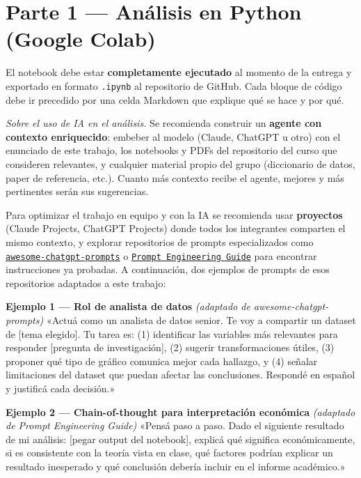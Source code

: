\documentclass[11pt,a4paper]{article}
\begin{document}
\section{Parte 1 --- Análisis en Python (Google Colab)}
El notebook debe estar \textbf{completamente ejecutado} al momento de la entrega y exportado en
formato \texttt{.ipynb} al repositorio de GitHub. Cada bloque de código debe ir precedido por una celda
Markdown que explique qué se hace y por qué.

\emph{Sobre el uso de IA en el análisis.} Se recomienda construir un \textbf{agente con contexto enriquecido}:
embeber al modelo (Claude, ChatGPT u otro) con el enunciado de este trabajo, los notebooks y
PDFs del repositorio del curso que consideren relevantes, y cualquier material propio del grupo
(diccionario de datos, paper de referencia, etc.). Cuanto más contexto recibe el agente, mejores y
más pertinentes serán sus sugerencias.

Para optimizar el trabajo en equipo y con la IA se recomienda usar \textbf{proyectos} (Claude Projects,
ChatGPT Projects) donde todos los integrantes comparten el mismo contexto, y explorar
repositorios de prompts especializados como
\href{https://github.com/f/awesome-chatgpt-prompts}{\texttt{awesome-chatgpt-prompts}} o
\href{https://github.com/dair-ai/Prompt-Engineering-Guide}{\texttt{Prompt Engineering Guide}}
para encontrar instrucciones ya probadas. A continuación, dos ejemplos de prompts de esos
repositorios adaptados a este trabajo:

\begin{prompt}{\textbf{Ejemplo 1 --- Rol de analista de datos} \emph{(adaptado de awesome-chatgpt-prompts)}}
\ttfamily «Actuá como un analista de datos senior. Te voy a compartir un dataset de [tema
elegido]. Tu tarea es: (1) identificar las variables más relevantes para responder
[pregunta de investigación], (2) sugerir transformaciones útiles, (3) proponer
qué tipo de gráfico comunica mejor cada hallazgo, y (4) señalar limitaciones del
dataset que puedan afectar las conclusiones. Respondé en español y justificá cada
decisión.»
\end{prompt}

\begin{prompt}{\textbf{Ejemplo 2 --- Chain-of-thought para interpretación económica} \emph{(adaptado de Prompt Engineering Guide)}}
\ttfamily «Pensá paso a paso. Dado el siguiente resultado de mi análisis: [pegar output
del notebook], explicá qué significa económicamente, si es consistente con la
teoría vista en clase, qué factores podrían explicar un resultado inesperado y
qué conclusión debería incluir en el informe académico.»
\end{prompt}
\end{document}
